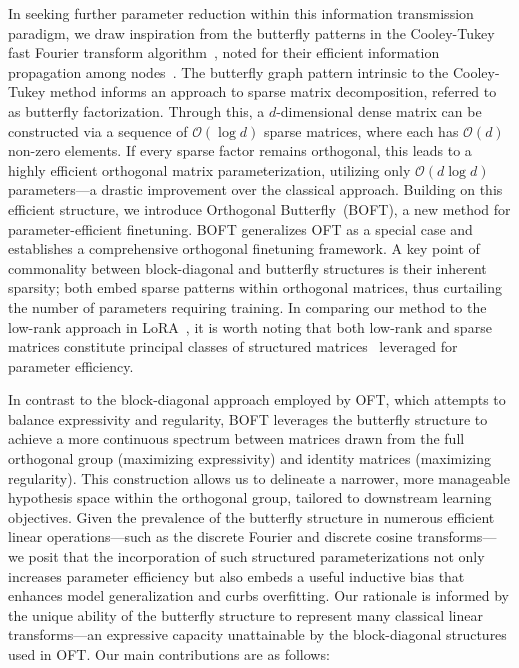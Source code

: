 In seeking further parameter reduction within this information transmission paradigm, we draw inspiration from the butterfly patterns in the Cooley-Tukey fast Fourier transform algorithm~\cite{cooley1965algorithm}, noted for their efficient information propagation among nodes~\cite{klasing1994broadcasting}. The butterfly graph pattern intrinsic to the Cooley-Tukey method informs an approach to sparse matrix decomposition, referred to as butterfly factorization. Through this, a $d$-dimensional dense matrix can be constructed via a sequence of $\mathcal{O}(\log d)$ sparse matrices, where each has $\mathcal{O}(d)$ non-zero elements. If every sparse factor remains orthogonal, this leads to a highly efficient orthogonal matrix parameterization, utilizing only $\mathcal{O}(d\log d)$ parameters—a drastic improvement over the classical approach. Building on this efficient structure, we introduce Orthogonal Butterfly~(BOFT), a new method for parameter-efficient finetuning. BOFT generalizes OFT as a special case and establishes a comprehensive orthogonal finetuning framework. A key point of commonality between block-diagonal and butterfly structures is their inherent sparsity; both embed sparse patterns within orthogonal matrices, thus curtailing the number of parameters requiring training. In comparing our method to the low-rank approach in LoRA~\cite{hulora2022}, it is worth noting that both low-rank and sparse matrices constitute principal classes of structured matrices~\cite{candes2011robust} leveraged for parameter efficiency.

In contrast to the block-diagonal approach employed by OFT, which attempts to balance expressivity and regularity, BOFT leverages the butterfly structure to achieve a more continuous spectrum between matrices drawn from the full orthogonal group (maximizing expressivity) and identity matrices (maximizing regularity). This construction allows us to delineate a narrower, more manageable hypothesis space within the orthogonal group, tailored to downstream learning objectives. Given the prevalence of the butterfly structure in numerous efficient linear operations—such as the discrete Fourier and discrete cosine transforms—we posit that the incorporation of such structured parameterizations not only increases parameter efficiency but also embeds a useful inductive bias that enhances model generalization and curbs overfitting. Our rationale is informed by the unique ability of the butterfly structure to represent many classical linear transforms—an expressive capacity unattainable by the block-diagonal structures used in OFT. Our main contributions are as follows:

